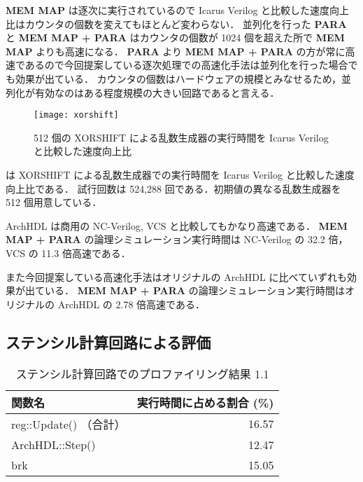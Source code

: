 \textbf{MEM MAP} は逐次に実行されているので Icarus Verilog と比較した速度向上比はカウンタの個数を変えてもほとんど変わらない．
並列化を行った \textbf{PARA} と \textbf{MEM MAP + PARA} はカウンタの個数が 1024 個を超えた所で \textbf{MEM MAP} よりも高速になる．
\textbf{PARA} より \textbf{MEM MAP + PARA} の方が常に高速であるので今回提案している逐次処理での高速化手法は並列化を行った場合でも効果が出ている．
カウンタの個数はハードウェアの規模とみなせるため，並列化が有効なのはある程度規模の大きい回路であると言える．


\begin{figure}[t]
 \centering
 \texttt{[image: xorshift]}
 \caption{512 個の XORSHIFT による乱数生成器の実行時間を Icarus Verilog と比較した速度向上比}
 \label{fig:xorshift}
\end{figure}

 は XORSHIFT による乱数生成器での実行時間を Icarus Verilog と比較した速度向上比である．
試行回数は 524,288 回である．初期値の異なる乱数生成器を 512 個用意している．

ArchHDL は商用の NC-Verilog, VCS と比較してもかなり高速である．
\textbf{MEM MAP + PARA} の論理シミュレーション実行時間は NC-Verilog の 32.2 倍，VCS の 11.3 倍高速である．

また今回提案している高速化手法はオリジナルの ArchHDL に比べていずれも効果が出ている．
\textbf{MEM MAP + PARA} の論理シミュレーション実行時間はオリジナルの ArchHDL の 2.78 倍高速である．


\subsection{ステンシル計算回路による評価}


\begin{table}[t]
 \caption{ステンシル計算回路でのプロファイリング結果 1.1}
 \label{table:stencil_prof1.1}
 \begin{center}
  \begin{tabular}{lr} \toprule
  関数名 & 実行時間に占める割合 (\%) \\ \midrule
  reg::Update() （合計） & 16.57 \\
  ArchHDL::Step() & 12.47 \\
  brk & 15.05 \\ \bottomrule
  \end{tabular}
 \end{center}
\end{table}

